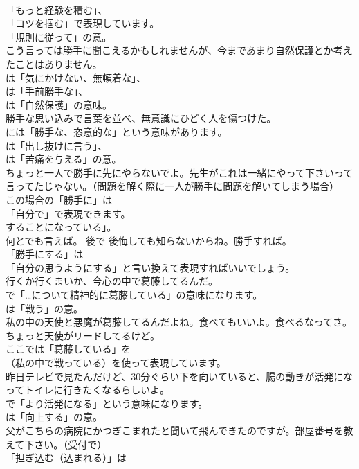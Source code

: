 \documentclass[8pt]{extreport}
\begin{document}
\begin{CJK}{UTF8}{min}
\\	「もっと経験を積む」、
\\	「コツを掴む」で表現しています。
\\	「規則に従って」の意。	
\\	こう言っては勝手に聞こえるかもしれませんが、今まであまり自然保護とか考えたことはありません。 
\\	は「気にかけない、無頓着な」、
\\	は「手前勝手な」、
\\	は「自然保護」の意味。	
\\	勝手な思い込みで言葉を並べ、無意識にひどく人を傷つけた。 
\\	には「勝手な、恣意的な」という意味があります。
\\	は「出し抜けに言う」、
\\	は「苦痛を与える」の意。	
\\	ちょっと一人で勝手に先にやらないでよ。先生がこれは一緒にやって下さいって言ってたじゃない。（問題を解く際に一人が勝手に問題を解いてしまう場合） 
\\	この場合の「勝手に」は
\\	「自分で」で表現できます。
\\	することになっている」。	
\\	何とでも言えば。 後で 後悔しても知らないからね。勝手すれば。 
\\	「勝手にする」は
\\	「自分の思うようにする」と言い換えて表現すればいいでしょう。	
\\	行くか行くまいか、今心の中で葛藤してるんだ。 
\\	で「…について精神的に葛藤している」の意味になります。
\\	は「戦う」の意。	
\\	私の中の天使と悪魔が葛藤してるんだよね。食べてもいいよ。食べるなってさ。ちょっと天使がリードしてるけど。 
\\	ここでは「葛藤している」を 
\\	（私の中で戦っている）を使って表現しています。	
\\	昨日テレビで見たんだけど、30分ぐらい下を向いていると、腸の動きが活発になってトイレに行きたくなるらしいよ。 
\\	で「より活発になる」という意味になります。
\\	は「向上する」の意。	
\\	父がこちらの病院にかつぎこまれたと聞いて飛んできたのですが。部屋番号を教えて下さい。（受付で） 
\\	「担ぎ込む（込まれる）」は

\end{CJK}
\end{document}
